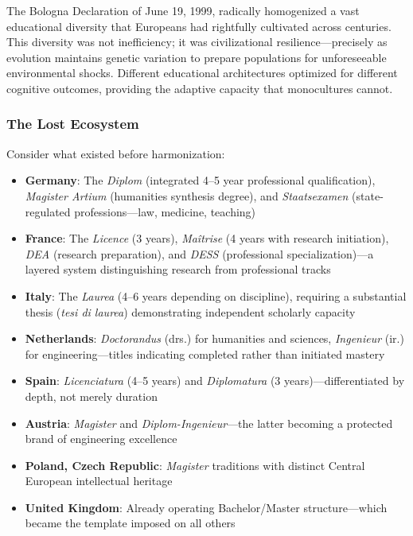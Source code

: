 The Bologna Declaration of June 19, 1999, radically homogenized a vast educational diversity that Europeans had rightfully cultivated across centuries. This diversity was not inefficiency; it was civilizational resilience---precisely as evolution maintains genetic variation to prepare populations for unforeseeable environmental shocks. Different educational architectures optimized for different cognitive outcomes, providing the adaptive capacity that monocultures cannot.

\subsubsection{The Lost Ecosystem}

Consider what existed before harmonization:

\begin{itemize}
    \item \textbf{Germany}: The \textit{Diplom} (integrated 4--5 year professional qualification), \textit{Magister Artium} (humanities synthesis degree), and \textit{Staatsexamen} (state-regulated professions---law, medicine, teaching)
    
    \item \textbf{France}: The \textit{Licence} (3 years), \textit{Maîtrise} (4 years with research initiation), \textit{DEA} (research preparation), and \textit{DESS} (professional specialization)---a layered system distinguishing research from professional tracks
    
    \item \textbf{Italy}: The \textit{Laurea} (4--6 years depending on discipline), requiring a substantial thesis (\textit{tesi di laurea}) demonstrating independent scholarly capacity
    
    \item \textbf{Netherlands}: \textit{Doctorandus} (drs.) for humanities and sciences, \textit{Ingenieur} (ir.) for engineering---titles indicating completed rather than initiated mastery
    
    \item \textbf{Spain}: \textit{Licenciatura} (4--5 years) and \textit{Diplomatura} (3 years)---differentiated by depth, not merely duration
    
    \item \textbf{Austria}: \textit{Magister} and \textit{Diplom-Ingenieur}---the latter becoming a protected brand of engineering excellence
    
    \item \textbf{Poland, Czech Republic}: \textit{Magister} traditions with distinct Central European intellectual heritage
    
    \item \textbf{United Kingdom}: Already operating Bachelor/Master structure---which became the template imposed on all others
\end{itemize}

